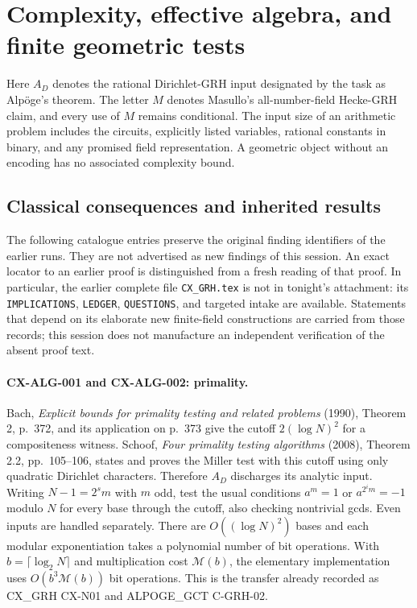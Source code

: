 \section{Complexity, effective algebra, and finite geometric tests}
\label{sec:complexity}

Here $A_D$ denotes the rational Dirichlet-GRH input designated by the task as
Alp\"oge's theorem. The letter $M$ denotes Masullo's all-number-field Hecke-GRH
claim, and every use of $M$ remains conditional. The input size of an arithmetic
problem includes the circuits, explicitly listed variables, rational constants
in binary, and any promised field representation. A geometric object without
an encoding has no associated complexity bound.

\subsection{Classical consequences and inherited results}

The following catalogue entries preserve the original finding identifiers of
the earlier runs. They are not advertised as new findings of this session.
An exact locator to an earlier proof is distinguished from a fresh reading of
that proof. In particular, the earlier complete file \texttt{CX\_GRH.tex} is
not in tonight's attachment: its \texttt{IMPLICATIONS}, \texttt{LEDGER},
\texttt{QUESTIONS}, and targeted intake are available. Statements that depend
on its elaborate new finite-field constructions are carried from those records;
this session does not manufacture an independent verification of the absent
proof text.

\paragraph{CX-ALG-001 and CX-ALG-002: primality.}
Bach, \emph{Explicit bounds for primality testing and related problems}
(1990), Theorem 2, p.~372, and its application on p.~373 give the cutoff
$2(\log N)^2$ for a compositeness witness. Schoof, \emph{Four primality testing
algorithms} (2008), Theorem 2.2, pp.~105--106, states and proves the Miller test
with this cutoff using only quadratic Dirichlet characters. Therefore $A_D$
discharges its analytic input. Writing $N-1=2^s m$ with $m$ odd, test the usual
conditions $a^m=1$ or $a^{2^i m}=-1$ modulo $N$ for every base through the
cutoff, also checking nontrivial gcds. Even inputs are handled separately.
There are $O((\log N)^2)$ bases and each modular exponentiation takes a
polynomial number of bit operations. With $b=\lceil\log_2N\rceil$ and
multiplication cost $\mathcal M(b)$, the elementary implementation uses
$O(b^3\mathcal M(b))$ bit operations. This is the transfer already recorded
as CX\_GRH CX-N01 and ALPOGE\_GCT C-GRH-02.


